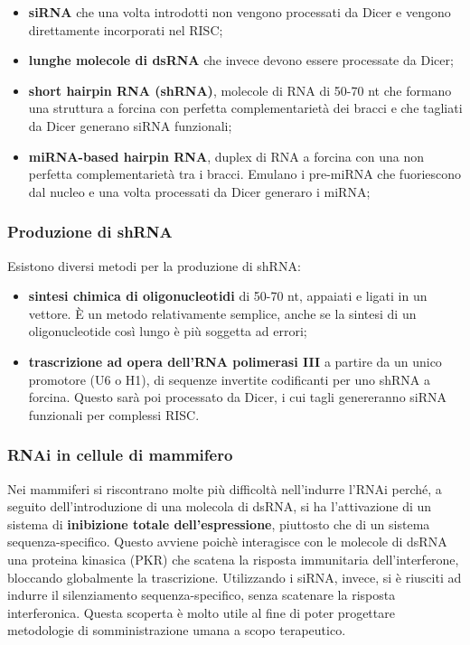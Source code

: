 \documentclass[]{article}
\begin{document}
\begin{itemize}
\itemsep1pt\parskip0pt
\item
  \textbf{siRNA} che una volta introdotti non vengono processati da
  Dicer e vengono direttamente incorporati nel RISC;
\item
  \textbf{lunghe molecole di dsRNA} che invece devono essere processate
  da Dicer;
\item
  \textbf{short hairpin RNA (shRNA)}, molecole di RNA di 50-70 nt che
  formano una struttura a forcina con perfetta complementarietà dei
  bracci e che tagliati da Dicer generano siRNA funzionali;
\item
  \textbf{miRNA-based hairpin RNA}, duplex di RNA a forcina con una non
  perfetta complementarietà tra i bracci. Emulano i pre-miRNA che
  fuoriescono dal nucleo e una volta processati da Dicer generaro i
  miRNA;
\end{itemize}

\subsubsection{Produzione di shRNA}\label{produzione-di-shrna}

Esistono diversi metodi per la produzione di shRNA:

\begin{itemize}
\itemsep1pt\parskip0pt
\item
  \textbf{sintesi chimica di oligonucleotidi} di 50-70 nt, appaiati e
  ligati in un vettore. È un metodo relativamente semplice, anche se la
  sintesi di un oligonucleotide così lungo è più soggetta ad errori;
\item
  \textbf{trascrizione ad opera dell'RNA polimerasi III} a partire da un
  unico promotore (U6 o H1), di sequenze invertite codificanti per uno
  shRNA a forcina. Questo sarà poi processato da Dicer, i cui tagli
  genereranno siRNA funzionali per complessi RISC.
\end{itemize}

\subsubsection{RNAi in cellule di
mammifero}\label{rnai-in-cellule-di-mammifero}

Nei mammiferi si riscontrano molte più difficoltà nell'indurre l'RNAi
perché, a seguito dell'introduzione di una molecola di dsRNA, si ha
l'attivazione di un sistema di \textbf{inibizione totale
dell'espressione}, piuttosto che di un sistema sequenza-specifico.
Questo avviene poichè interagisce con le molecole di dsRNA una proteina
kinasica (PKR) che scatena la risposta immunitaria dell'interferone,
bloccando globalmente la trascrizione. Utilizzando i siRNA, invece, si è
riusciti ad indurre il silenziamento sequenza-specifico, senza scatenare
la risposta interferonica. Questa scoperta è molto utile al fine di
poter progettare metodologie di somministrazione umana a scopo
terapeutico.
\end{document}
